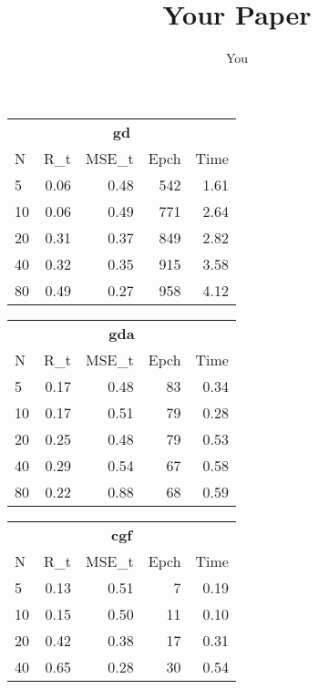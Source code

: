 \documentclass[a4paper, 10pt]{article}
\title{Your Paper}
\author{You}
\begin{document}
\maketitle
\begin{table}[h!]
    \begin{tabular}{@{}lrrrr@{}}
      \toprule
      \multicolumn{5}{c}{\textbf{gd}} \\
      N  &   R_{t}  &  MSE_{t} &  Epch  & Time \\
      \midrule
       5       &   0.06     &  0.48       &  542     & 1.61   \\
      10       &   0.06     &  0.49       &  771     & 2.64   \\
      20       &   0.31     &  0.37       &  849     & 2.82   \\
      40       &   0.32     &  0.35       &  915     & 3.58   \\
      80       &   0.49     &  0.27       &  958     & 4.12   \\
      \bottomrule
    \end{tabular} 
    \hfill
    \begin{tabular}{@{}lrrrr@{}}
      \toprule
      \multicolumn{5}{c}{\textbf{gda}} \\
      N  &   R_{t}  &  MSE_{t} &  Epch  & Time \\
      \midrule
       5  & 0.17    & 0.48    & 83      &  0.34   \\
      10  & 0.17    & 0.51    & 79      &  0.28   \\
      20  & 0.25    & 0.48    & 79      &  0.53   \\
      40  & 0.29    & 0.54    & 67      &  0.58   \\
      80  & 0.22    & 0.88    & 68      &  0.59   \\                 
      \bottomrule
    \end{tabular} 
    \hfill
    \begin{tabular}{@{}lrrrr@{}}
      \toprule
      \multicolumn{5}{c}{\textbf{cgf}} \\
      N  &   R_{t}  &  MSE_{t} &  Epch  & Time \\
      \midrule
       5  & 0.13    & 0.51    &  7      &  0.19  \\
      10  & 0.15    & 0.50    & 11      &  0.10  \\
      20  & 0.42    & 0.38    & 17      &  0.31  \\
      40  & 0.65    & 0.28    & 30      &  0.54  \\

\end{tabular}
\end{table}
\end{document}
